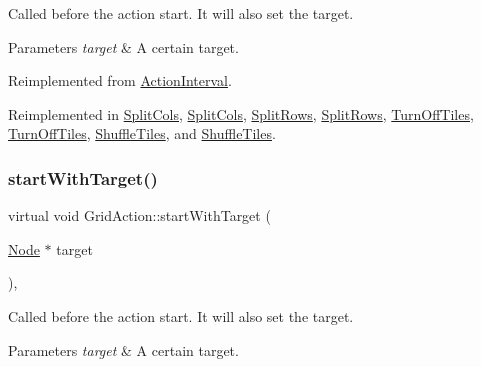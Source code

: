 Called before the action start. It will also set the target.


\begin{DoxyParams}{Parameters}
{\em target} & A certain target. \\
\hline
\end{DoxyParams}


Reimplemented from \hyperlink{classActionInterval_ad3d91186b2c3108488ddbbdbbd982484}{Action\+Interval}.



Reimplemented in \hyperlink{classSplitCols_ae9600d8beda7affc5d8eb29624978698}{Split\+Cols}, \hyperlink{classSplitCols_a6378035983a5b7f31ea3f3e2638a750c}{Split\+Cols}, \hyperlink{classSplitRows_a12d92df62d1f441371e4563fc3aa3196}{Split\+Rows}, \hyperlink{classSplitRows_a46357d39bbf4e251086b42e4ad9ba9a1}{Split\+Rows}, \hyperlink{classTurnOffTiles_adb571aa2b12a065bb9cd94fe2c1f9eb0}{Turn\+Off\+Tiles}, \hyperlink{classTurnOffTiles_ac06cc826e738b0fe0df40fe554a00d45}{Turn\+Off\+Tiles}, \hyperlink{classShuffleTiles_af9880bf4abd44f5b605ab1a47159e817}{Shuffle\+Tiles}, and \hyperlink{classShuffleTiles_aa5b245843f208ba8300d6eb302937163}{Shuffle\+Tiles}.

\mbox{\label{classGridAction_a04dfa701007c415bb130766c99357334}} 
\subsubsection{\texorpdfstring{start\+With\+Target()}{startWithTarget()}\hspace{0.1cm}{\footnotesize\ttfamily [2/2]}}
{\footnotesize\ttfamily virtual void Grid\+Action\+::start\+With\+Target (\begin{DoxyParamCaption}\item[{\hyperlink{classNode}{Node} $\ast$}]{target }\end{DoxyParamCaption})\hspace{0.3cm}{\ttfamily [override]}, {\ttfamily [virtual]}}

Called before the action start. It will also set the target.


\begin{DoxyParams}{Parameters}
{\em target} & A certain target. \\
\hline
\end{DoxyParams}



